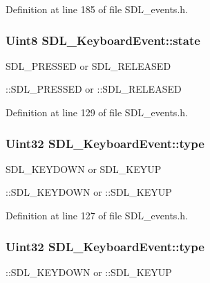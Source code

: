 Definition at line 185 of file S\+D\+L\+\_\+events.\+h.

\hypertarget{structSDL__KeyboardEvent_a110558eb96c113c86cfa31a7018c2346}{
\subsubsection[{state}]{\setlength{\rightskip}{0pt plus 5cm}Uint8 S\+D\+L\+\_\+\+Keyboard\+Event\+::state}}\label{structSDL__KeyboardEvent_a110558eb96c113c86cfa31a7018c2346}
S\+D\+L\+\_\+\+P\+R\+E\+S\+S\+E\+D or S\+D\+L\+\_\+\+R\+E\+L\+E\+A\+S\+E\+D

\+::\+S\+D\+L\+\_\+\+P\+R\+E\+S\+S\+E\+D or \+::\+S\+D\+L\+\_\+\+R\+E\+L\+E\+A\+S\+E\+D 

Definition at line 129 of file S\+D\+L\+\_\+events.\+h.

\hypertarget{structSDL__KeyboardEvent_ae0b2f2aace6f80c1f47e5a14350d409a}{
\subsubsection[{type}]{\setlength{\rightskip}{0pt plus 5cm}Uint32 S\+D\+L\+\_\+\+Keyboard\+Event\+::type}}\label{structSDL__KeyboardEvent_ae0b2f2aace6f80c1f47e5a14350d409a}
S\+D\+L\+\_\+\+K\+E\+Y\+D\+O\+W\+N or S\+D\+L\+\_\+\+K\+E\+Y\+U\+P

\+::\+S\+D\+L\+\_\+\+K\+E\+Y\+D\+O\+W\+N or \+::\+S\+D\+L\+\_\+\+K\+E\+Y\+U\+P 

Definition at line 127 of file S\+D\+L\+\_\+events.\+h.

\hypertarget{structSDL__KeyboardEvent_ae0b2f2aace6f80c1f47e5a14350d409a}{
\subsubsection[{type}]{\setlength{\rightskip}{0pt plus 5cm}Uint32 S\+D\+L\+\_\+\+Keyboard\+Event\+::type}}\label{structSDL__KeyboardEvent_ae0b2f2aace6f80c1f47e5a14350d409a}
\+::\+S\+D\+L\+\_\+\+K\+E\+Y\+D\+O\+W\+N or \+::\+S\+D\+L\+\_\+\+K\+E\+Y\+U\+P 

